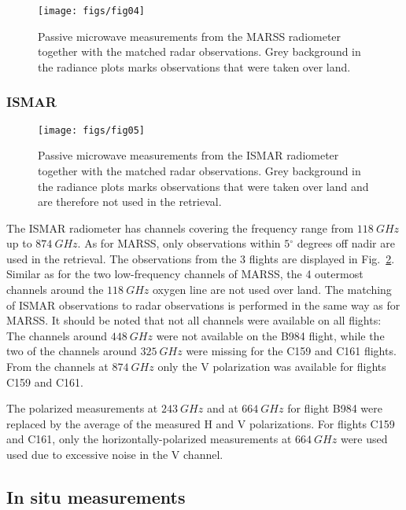 \documentclass[journal abbreviation, manuscript]{copernicus}
\begin{document}
\begin{figure}[h!]
  \centering
  \texttt{[image: figs/fig04]}
  \caption{
    Passive microwave measurements from the MARSS radiometer together with the
    matched radar observations. Grey background in the radiance plots marks
    observations that were taken over land.
    }
  \label{fig:observations_marss}
\end{figure}


\subsubsection{ISMAR}

\begin{figure}[h!]
  \centering
  \texttt{[image: figs/fig05]}
  \caption{
    Passive microwave measurements from the ISMAR radiometer together with the
    matched radar observations. Grey background in the radiance plots marks
    observations that were taken over land and are therefore not used in
    the retrieval.
    }
  \label{fig:observations_ismar}
\end{figure}

The ISMAR radiometer has channels covering the frequency range from
$118\ \unit{GHz}$ up to $874\ \unit{GHz}$. As for MARSS, only observations
within $5\unit{^\circ}$ degrees off nadir are used in the retrieval. The
observations from the 3 flights are displayed in
Fig.~\ref{fig:observations_ismar}. Similar as for the two low-frequency
channels of MARSS, the 4 outermost channels around the $118\ \unit{GHz}$ oxygen
line are not used over land. The matching of ISMAR observations to radar
observations is performed in the same way as for MARSS. It should be noted that
not all channels were available on all flights: The channels around
$448\ \unit{GHz}$ were not available on the B984 flight, while the two of the
channels around $325\ \unit{GHz}$ were missing for the C159 and C161 flights.
From the channels at $874\ \unit{GHz}$ only the V polarization was available
for flights C159 and C161.

The polarized measurements at $243\ \unit{GHz}$ and at $664\ \unit{GHz}$ for
flight B984 were replaced by the average of the measured H and V polarizations.
For flights C159 and C161, only the horizontally-polarized measurements at
$664\ \unit{GHz}$ were used used due to excessive noise in the V channel.

\subsection{In situ measurements}
\label{sec:in_situ}
\end{document}
